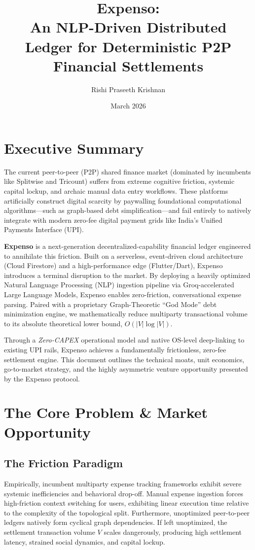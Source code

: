 \documentclass[11pt, letterpaper]{article}
\title{\textbf{Expenso:} \\ \large An NLP-Driven Distributed Ledger for Deterministic P2P Financial Settlements}
\author{Rishi Praseeth Krishnan}
\date{March 2026}
\begin{document}
\maketitle

\tableofcontents

\vspace{1cm}
\section*{Executive Summary}
The current peer-to-peer (P2P) shared finance market (dominated by incumbents like Splitwise and Tricount) suffers from extreme cognitive friction, systemic capital lockup, and archaic manual data entry workflows. These platforms artificially construct digital scarcity by paywalling foundational computational algorithms—such as graph-based debt simplification—and fail entirely to natively integrate with modern zero-fee digital payment grids like India's Unified Payments Interface (UPI).

\textbf{Expenso} is a next-generation decentralized-capability financial ledger engineered to annihilate this friction. Built on a serverless, event-driven cloud architecture (Cloud Firestore) and a high-performance edge (Flutter/Dart), Expenso introduces a terminal disruption to the market. By deploying a heavily optimized Natural Language Processing (NLP) ingestion pipeline via Groq-accelerated Large Language Models, Expenso enables zero-friction, conversational expense parsing. Paired with a proprietary Graph-Theoretic ``God Mode'' debt minimization engine, we mathematically reduce multiparty transactional volume to its absolute theoretical lower bound, $O(|V| \log |V|)$. 

Through a \textit{Zero-CAPEX} operational model and native OS-level deep-linking to existing UPI rails, Expenso achieves a fundamentally frictionless, zero-fee settlement engine. This document outlines the technical moats, unit economics, go-to-market strategy, and the highly asymmetric venture opportunity presented by the Expenso protocol.

\newpage

\section{The Core Problem \& Market Opportunity}
\subsection{The Friction Paradigm}
Empirically, incumbent multiparty expense tracking frameworks exhibit severe systemic inefficiencies and behavioral drop-off. Manual expense ingestion forces high-friction context switching for users, exhibiting linear execution time relative to the complexity of the topological split. 
Furthermore, unoptimized peer-to-peer ledgers natively form cyclical graph dependencies. If left unoptimized, the settlement transaction volume $V$ scales dangerously, producing high settlement latency, strained social dynamics, and capital lockup.
\end{document}
